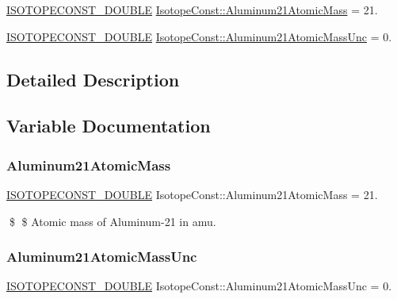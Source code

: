 \begin{DoxyCompactItemize}
\item 
\mbox{\hyperlink{group___isotope_const-_macros_ga8f45a7272ce02c0b4c65c44636ed719a}{I\+S\+O\+T\+O\+P\+E\+C\+O\+N\+S\+T\+\_\+\+D\+O\+U\+B\+LE}} \mbox{\hyperlink{group___isotope_const-_aluminum-_al21_ga922c105eda8f7ecb066e130e0a2a83ef}{Isotope\+Const\+::\+Aluminum21\+Atomic\+Mass}} = 21.
\item 
\mbox{\hyperlink{group___isotope_const-_macros_ga8f45a7272ce02c0b4c65c44636ed719a}{I\+S\+O\+T\+O\+P\+E\+C\+O\+N\+S\+T\+\_\+\+D\+O\+U\+B\+LE}} \mbox{\hyperlink{group___isotope_const-_aluminum-_al21_gaf026d58ab974c19373962b72b7744ffb}{Isotope\+Const\+::\+Aluminum21\+Atomic\+Mass\+Unc}} = 0.
\end{DoxyCompactItemize}


\subsection{Detailed Description}


\subsection{Variable Documentation}
\mbox{\label{group___isotope_const-_aluminum-_al21_ga922c105eda8f7ecb066e130e0a2a83ef}} 
\subsubsection{\texorpdfstring{Aluminum21\+Atomic\+Mass}{Aluminum21AtomicMass}}
{\footnotesize\ttfamily \mbox{\hyperlink{group___isotope_const-_macros_ga8f45a7272ce02c0b4c65c44636ed719a}{I\+S\+O\+T\+O\+P\+E\+C\+O\+N\+S\+T\+\_\+\+D\+O\+U\+B\+LE}} Isotope\+Const\+::\+Aluminum21\+Atomic\+Mass = 21.}

\$ \$ Atomic mass of Aluminum-\/21 in amu. \mbox{\label{group___isotope_const-_aluminum-_al21_gaf026d58ab974c19373962b72b7744ffb}} 
\subsubsection{\texorpdfstring{Aluminum21\+Atomic\+Mass\+Unc}{Aluminum21AtomicMassUnc}}
{\footnotesize\ttfamily \mbox{\hyperlink{group___isotope_const-_macros_ga8f45a7272ce02c0b4c65c44636ed719a}{I\+S\+O\+T\+O\+P\+E\+C\+O\+N\+S\+T\+\_\+\+D\+O\+U\+B\+LE}} Isotope\+Const\+::\+Aluminum21\+Atomic\+Mass\+Unc = 0.}


